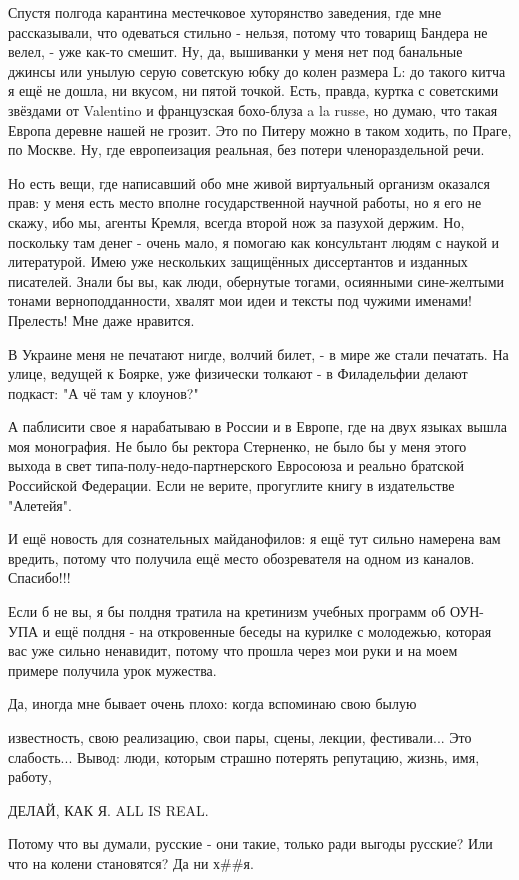 Спустя полгода карантина местечковое хуторянство заведения, где мне
рассказывали, что одеваться стильно - нельзя, потому что товарищ Бандера не
велел, - уже как-то смешит. Ну, да, вышиванки у меня нет под банальные джинсы
или унылую серую советскую юбку до колен размера L: до такого китча я ещё не
дошла, ни вкусом, ни пятой точкой. Есть, правда, куртка с советскими звёздами
от Valentino и французская бохо-блуза a la russe, но думаю, что такая Европа
деревне нашей не грозит. Это по Питеру можно в таком ходить, по Праге, по
Москве. Ну, где европеизация реальная, без потери членораздельной речи.

Но есть вещи, где написавший обо мне живой виртуальный организм оказался прав:
у меня есть место вполне государственной научной работы, но я его не скажу, ибо
мы, агенты Кремля, всегда второй нож за пазухой держим. Но, поскольку там денег
- очень мало, я помогаю как консультант людям с наукой и литературой. Имею уже
нескольких защищённых диссертантов и изданных писателей. Знали бы вы, как люди,
обернутые тогами, осиянными сине-желтыми тонами верноподданности, хвалят мои
идеи и тексты под чужими именами! Прелесть! Мне даже нравится.

В Украине меня не печатают нигде, волчий билет, - в мире же стали печатать. На
улице, ведущей к Боярке, уже физически толкают - в Филадельфии делают подкаст:
"А чё там у клоунов?"

А паблисити свое я нарабатываю в России и в Европе, где на двух языках вышла
моя монография. Не было бы ректора Стерненко, не было бы у меня этого выхода в
свет типа-полу-недо-партнерского Евросоюза и реально братской Российской
Федерации. Если не верите, прогуглите книгу в издательстве "Алетейя".

И ещё новость для сознательных майданофилов: я ещё тут сильно намерена вам
вредить, потому что получила ещё место обозревателя на одном из каналов.
Спасибо!!!

Если б не вы, я бы полдня тратила на кретинизм учебных программ об ОУН-УПА и
ещё полдня - на откровенные беседы на курилке с молодежью, которая вас уже
сильно ненавидит, потому что прошла через мои руки и на моем примере получила
урок мужества.

Да, иногда мне бывает очень плохо: когда вспоминаю свою былую

известность, свою реализацию, свои пары, сцены, лекции, фестивали... Это
слабость... Вывод: люди, которым страшно потерять репутацию, жизнь, имя,
работу,

ДЕЛАЙ, КАК Я. ALL IS REAL.

Потому что вы думали, русские - они такие, только ради выгоды русские? Или что
на колени становятся? Да ни х\#\#я.
